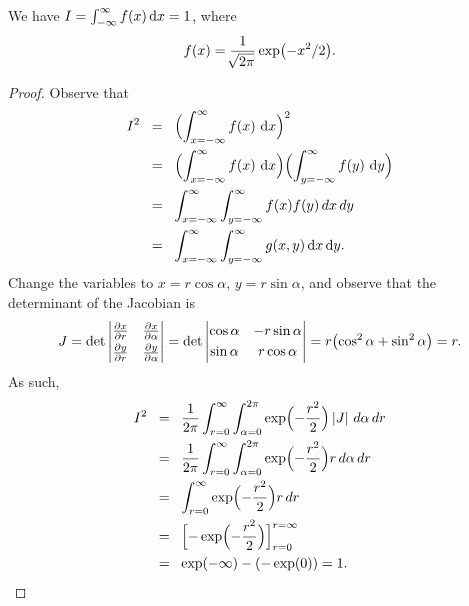 \begin{lemma}
    We have $I = \int_{-\infty}^\infty f(x) \mathop{}\!\mathrm{d}x = 1$, where
    \begin{equation*}
        f(x) = \frac{1}{\mysqrt{2\pi}} \exp \pth{ -x^2/2}.
    \end{equation*}
\end{lemma}
\begin{proof}
    Observe that 
    \begin{align*}
      I^2
      &\EQ%
        \Bigl(\int_{x=-\infty}^\infty f(x)\, \diffX{x} \Bigr)^2%
        \\&
        \EQ
        \Bigl( \int_{x=-\infty}^\infty f(x)\, \diffX{x} \Bigr)
        \Bigl( \int_{y=-\infty}^\infty f(y)\, \diffX{y} \Bigr)
        \\&
        \EQ
        \int_{x=-\infty}^\infty
        \int_{y=-\infty}^\infty f(x) f(y)\, dx \, dy
      \\&%
      \EQ
      \int_{x=-\infty}^\infty
      \int_{y=-\infty}^\infty g(x, y) \diffX{x} \diffX{y}.
    \end{align*}
    Change the variables to $x=r \cos \alpha$, $y = r\sin \alpha$, and
    observe that the determinant of the Jacobian is
    \[
    J = 
    \det \cardin{\begin{matrix}
           \frac{\partial x}{\partial r} 
           &
           \frac{\partial x}{\partial \alpha}\\[0.1cm]
           \frac{\partial y}{\partial r} 
           &
           \frac{\partial y}{\partial \alpha} 
       \end{matrix}}
    =%
    \det \cardin{\begin{matrix}%
           \cos \alpha &
           -r \sin \alpha  \\[0.1cm]
           \sin \alpha & r \cos \alpha
       \end{matrix}}
    = r \pth[]{\cos^2 \alpha + \sin^2 \alpha } = r.
    \]
    As such, 
    \begin{align*}
        I^2
        &\EQ
            \frac{1}{2\pi} \int_{r=0}^\infty \int_{\alpha=0}^{2\pi} \exp
            \Bigl( -\frac{r^2}{2} \Bigr) \cardin{J} \, d\alpha \, dr%
            \\&
            \EQ
            \frac{1}{2\pi} \int_{r=0}^\infty \int_{\alpha=0}^{2\pi} \exp
            \Bigl({ -\frac{r^2}{2}}\Bigr) r \, d\alpha \, dr
      \\
          &\EQ
            \int_{r=0}^\infty
            \exp \Bigl( -\frac{r^2}{2} \Bigr) r \, dr
            \\&
            \EQ
            \Bigl[ - \exp\Bigl( -\frac{r^2}{2} \Bigr) \Bigr]_{r=0}^{r=\infty}
            \\&
            \EQ%
            \exp( -\infty) - (-\exp( 0 ) ) = 1.
    \end{align*}
\end{proof}

